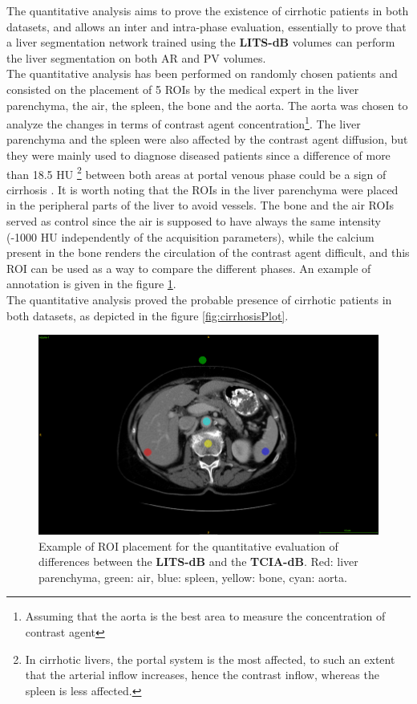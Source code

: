 \documentclass[]{article}
\newcommand{\lmttfont}[1]{{\fontfamily{lmtt}\selectfont #1}}
\begin{document}
The quantitative analysis aims to prove the existence of cirrhotic patients in both datasets, and allows an inter and intra-phase evaluation, essentially to prove that a liver segmentation network trained using the \textbf{\lmttfont{LITS-dB}} volumes can perform the liver segmentation on both AR and PV volumes. \\
The quantitative analysis has been performed on randomly chosen patients and consisted on the placement of 5 ROIs by the medical expert in the liver parenchyma, the air, the spleen, the bone and the aorta. The aorta was chosen to analyze the changes in terms of contrast agent concentration\footnote{Assuming that the aorta is the best area to measure the concentration of contrast agent}. The liver parenchyma and the spleen were also affected by the contrast agent diffusion, but they were mainly used to diagnose diseased patients since a difference of more than 18.5 HU \footnote{In cirrhotic livers, the portal system is the most affected, to such an extent that the arterial inflow increases, hence the contrast inflow, whereas the spleen is less affected.} between both areas at portal venous phase could be a sign of cirrhosis \cite{Wells2016}. It is worth noting that the ROIs in the liver parenchyma were placed in the peripheral parts of the liver to avoid vessels. The bone and the air ROIs served as control since the air is supposed to have always the same intensity (-1000 HU independently of the acquisition parameters), while the calcium present in the bone renders the circulation of the contrast agent difficult, and this ROI can be used as a way to compare the different phases. An example of annotation is given in the figure \ref{fig:roiPlacement}. \\
The quantitative analysis proved the probable presence of cirrhotic patients in both datasets, as depicted in the figure \ref{fig:cirrhosisPlot}.
\begin{figure}[!ht]
	\centering
	\includegraphics[width=0.6\linewidth]{../Contributions/images/Resizejuan_Roi_Example}
	\caption{Example of ROI placement for the quantitative evaluation of differences between the \textbf{\lmttfont{LITS-dB}} and the \textbf{\lmttfont{TCIA-dB}}. Red: liver parenchyma, green: air, blue: spleen, yellow: bone, cyan: aorta.}
	\label{fig:roiPlacement}
\end{figure}
\end{document}
